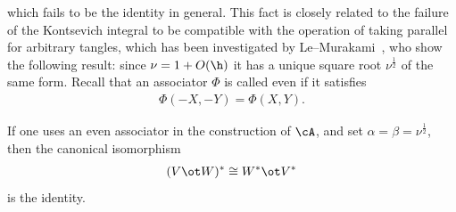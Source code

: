 which fails to be the identity in general. This fact is closely related to the failure of the Kontsevich integral to be compatible with the operation of taking parallel for arbitrary tangles, which has been investigated by Le--Murakami~\cite{Le1997}, who show the following result: since $\nu=1+O(\h)$ it has a unique square root $\nu^{\frac12}$ of the same form. Recall that an associator $\Phi$ is called even if it satisf\/ies
\begin{gather*}
	\Phi(-X,-Y)=\Phi(X,Y).
\end{gather*}
\begin{thm}[Le--Murakami]\label{thm:LM}
	If one uses an even associator in the construction of $\cA$, and set $\alpha=\beta=\nu^{\frac12}$, then the canonical isomorphism
	\begin{gather*}
		(V \ot W)^*\cong W^* \ot V^*
	\end{gather*}
	is the identity.
\end{thm}

